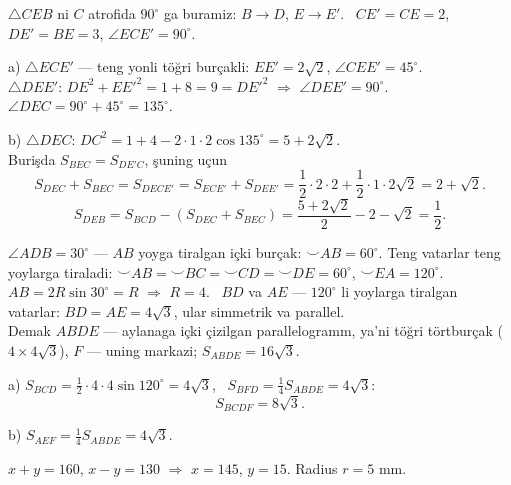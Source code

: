 \newpage
{}
$\triangle CEB$ ni $C$ atrofida $90^\circ$ ga buramiz: $B\to D$, $E\to E'$. \ $CE'=CE=2$, $DE'=BE=3$, $\angle ECE'=90^\circ$.

a) $\triangle ECE'$ — teng yonli töğri burçakli: $EE'=2\sqrt2$, $\angle CEE'=45^\circ$.\\
$\triangle DEE'$: $DE^2+EE'^2=1+8=9=DE'^2$ $\Rightarrow$ $\angle DEE'=90^\circ$.\\
$\angle DEC=90^\circ+45^\circ=135^\circ$.

b) $\triangle DEC$: $DC^2=1+4-2\cdot1\cdot2\cos135^\circ=5+2\sqrt2$.\\
Burişda $S_{BEC}=S_{DE'C}$, şuning uçun
\[S_{DEC}+S_{BEC}=S_{DECE'}=S_{ECE'}+S_{DEE'}=\frac12\cdot2\cdot2+\frac12\cdot1\cdot2\sqrt2=2+\sqrt2.\]
\[S_{DEB}=S_{BCD}-\left(S_{DEC}+S_{BEC}\right)=\frac{5+2\sqrt2}2-2-\sqrt2=\frac12.\]

\newpage
{}
$\angle ADB=30^\circ$ — $AB$ yoyga tiralgan içki burçak: $\smile AB=60^\circ$. Teng vatarlar teng yoylarga tiraladi: $\smile AB=\smile BC=\smile CD=\smile DE=60^\circ$, $\smile EA=120^\circ$.\\
$AB=2R\sin30^\circ=R$ $\Rightarrow$ $R=4$. \ $BD$ va $AE$ — $120^\circ$ li yoylarga tiralgan vatarlar: $BD=AE=4\sqrt3$, ular simmetrik va parallel.\\
Demak $ABDE$ — aylanaga içki çizilgan parallelogramm, ya'ni töğri törtburçak ($4\times4\sqrt3$), $F$ — uning markazi; $S_{ABDE}=16\sqrt3$.

a) $S_{BCD}=\frac12\cdot4\cdot4\sin120^\circ=4\sqrt3$, \ $S_{BFD}=\frac14S_{ABDE}=4\sqrt3$:
\[S_{BCDF}=8\sqrt3.\]

b) $S_{AEF}=\frac14S_{ABDE}=4\sqrt3$.

\newpage
{}
$x+y=160$, $x-y=130$ $\Rightarrow$ $x=145$, $y=15$. Radius $r=5$ mm.

